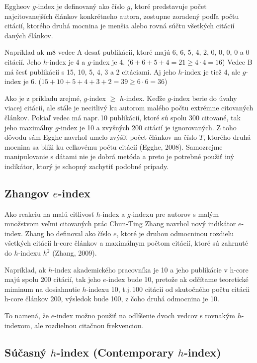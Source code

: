 Eggheov $g$-index je definovaný ako číslo $g$, ktoré predstavuje počet
najcitovanejších článkov konkrétneho autora, zostupne zoradený podľa počtu
citácií, ktorého druhá mocnina je menšia alebo rovná súčtu všetkých citácií
daných článkov.

Napríklad ak m8 vedec A desať publikácií, ktoré majú 6, 6, 5, 4, 2, 0, 0, 0, 0 a
0 citácií.  Jeho $h$-index je 4 a $g$-index je 4.
($6+6+5+4 = 21 \geq 4\cdot4=16$) Vedec B má šesť publikácií s 15, 10, 5, 4, 3 a
2 citáciami.  Aj jeho $h$-index je tiež 4, ale $g$-index je 6.
($15+10+5+4+3+2 = 39 \geq 6\cdot6 = 36$)

Ako je z príkladu zrejmé, $g$-index $\geq$ $h$-index.  Keďže $g$-index berie do
úvahy viacej citácií, ale stále je necitlivý ku autorom malého počtu extrémne
citovaných článkov.  Pokiaľ vedec má napr.\,10 publikácií, ktoré sú spolu 300
citované, tak jeho maximálny $g$-index je 10 a zvyšných 200 citácií je
ignorovaných.  Z toho dôvodu sám Egghe navrhol umelo zvýšiť počet článkov na
číslo $T$, ktorého druhá mocnina sa blíži ku celkovému počtu citácií (Egghe,
2008).  Samozrejme manipulovanie s dátami nie je dobrá metóda a preto je
potrebné použiť iný indikátor, ktorý je schopný zachytiť podobné prípady.


\subsection{Zhangov $e$-index}

Ako reakciu na malú citlivosť $h$-index a $g$-indexu pre autorov s malým
množstvom veľmi citovaných prác Chun-Ting Zhang navrhol nový indikátor
$e$-index.  Zhang ho definoval ako číslo $e$, ktoré je druhou odmocninou
rozdielu všetkých citácií h-core článkov a maximálnym počtom citácií, ktoré sú
zahrnuté do $h$-indexu $h^2$ (Zhang, 2009).

Napríklad, ak $h$-index akademického pracovníka je 10 a jeho publikácie v h-core
majú spolu 200 citácií, tak jeho $e$-index bude 10, pretože ak odčítame
teoretické miminum na dosiahnutie $h$-indexu 10, t.j.\,100 citácii od skutočného
počtu citácii h-core článkov 200, výsledok bude 100, z čoho druhá odmocnina je
10.

To namená, že $e$-index možno použiť na odlíšenie dvoch vedcov s rovnakým
$h$-indexom, ale rozdielnou citačnou frekvenciou.


\subsection{Súčasný $h$-index (Contemporary $h$-index)}

